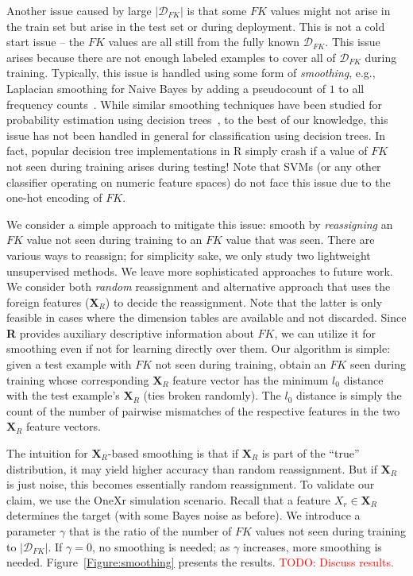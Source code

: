 \documentclass[sigconf]{acmart}
\newcommand{\red}{\textcolor{red}}
\begin{document}
Another issue caused by large $|\mathcal{D}_{FK}|$ is that some $FK$ values might not arise in the train set but arise 
in the test set or during deployment. This is not a cold start issue -- the $FK$ values are all still from the fully known $\mathcal{D}_{FK}$. 
This issue arises because there are not enough labeled examples to cover all of $\mathcal{D}_{FK}$ during training. 
Typically, this issue is handled using some form of \textit{smoothing}, e.g., Laplacian smoothing
for Naive Bayes by adding a pseudocount of $1$ to all frequency counts~\cite{mitchellbook}.
While similar smoothing techniques have been studied for probability estimation using decision trees~\cite{pedro2003}, to the best of our knowledge, 
this issue has not been handled in general for classification using decision trees. In fact, popular decision tree implementations in R simply 
crash if a value of $FK$ not seen during training arises during testing! Note that SVMs (or any other classifier operating on numeric 
feature spaces) do not face this issue due to the one-hot encoding of $FK$. 

We consider a simple approach to mitigate this issue: smooth by \textit{reassigning} an $FK$ value not seen during training to an $FK$ value that was
seen. There are various ways to reassign; for simplicity sake, we only study two lightweight unsupervised methods.
We leave more sophisticated approaches to future work.
We consider both \textit{random} reassignment and alternative approach that uses the foreign features ($\textbf{X}_R$) to decide the reassignment. 
Note that the latter is only feasible in cases where the dimension tables are available and not discarded. Since \textbf{R} provides auxiliary 
descriptive information about $FK$, we can utilize it for smoothing even if not for learning directly over them.
Our algorithm is simple: given a test example with $FK$ not seen during training, obtain an $FK$ seen during training whose corresponding 
$\textbf{X}_R$ feature vector has the minimum $l_0$ distance with the test example's $\textbf{X}_R$ (ties broken randomly). The $l_0$ distance is
simply the count of the number of pairwise mismatches of the respective features in the two $\textbf{X}_R$ feature vectors. 

The intuition for $\textbf{X}_R$-based smoothing is that if $\textbf{X}_R$ is part of the ``true'' distribution, it may yield higher accuracy 
than random reassignment. But if $\textbf{X}_R$ is just noise, this becomes essentially random reassignment.
To validate our claim, we use the OneXr simulation scenario. Recall that a feature $X_r \in \textbf{X}_R$
determines the target (with some Bayes noise as before). We introduce a parameter $\gamma$ that is the ratio of the number of $FK$ values not seen 
during training to $|\mathcal{D}_{FK}|$. If $\gamma = 0$, no smoothing is needed; as $\gamma$ increases, more smoothing is needed.
Figure~\ref{Figure:smoothing} presents the results. \red{TODO: Discuss results.}







\end{document}
